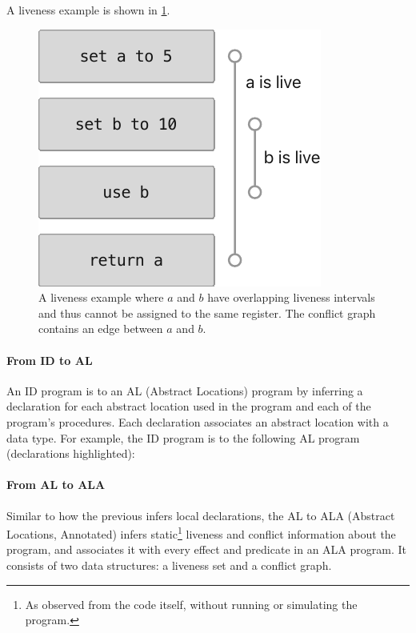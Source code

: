 \documentclass[main.tex]{subfiles}
\begin{document}
A liveness example is shown in \cref{fig:liveness}.

\begin{figure}
	\centering
	\includegraphics{Images/Liveness.pdf}
	\caption{A liveness example where $a$ and $b$ have overlapping liveness intervals and thus cannot be assigned to the same register. The conflict graph contains an edge between $a$ and $b$.}
	\label{fig:liveness}
\end{figure}

\paragraph{From ID to AL} An ID program is \lowered{} to an AL (Abstract Locations) program by inferring a declaration for each abstract location used in the program and each of the program's procedures. Each declaration associates an abstract location with a data type. For example, the ID program
is \lowered{} to the following AL program (declarations highlighted):

\paragraph{From AL to ALA} Similar to how the previous  infers local declarations, the AL to ALA (Abstract Locations, Annotated)  infers static\footnote{As observed from the code itself, without running or simulating the program.} liveness and conflict information about the program, and associates it with every effect and predicate in an ALA program. It consists of two data structures: a liveness set and a conflict graph.
\end{document}
